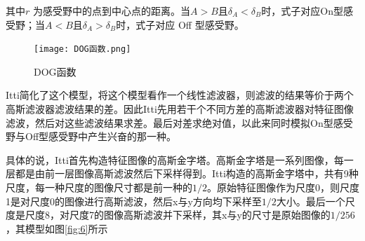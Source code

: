 \documentclass[a4paper,12pt]{article}
\begin{document}
其中$r$ 为感受野中的点到中心点的距离。当$A>B$且$\delta_{A}<\delta_{B}$时，式子对应On型感受野；当$A<B$且$\delta_{A}>\delta_{B}$时，式子对应 Off 型感受野。
\begin{figure}[!htb]
\centering
\texttt{[image: DOG函数.png]}
\caption{DOG函数}\label{fig:5} 
\end{figure}

Itti简化了这个模型，将这个模型看作一个线性滤波器，则滤波的结果等价于两个高斯滤波器滤波结果的差。因此Itti先用若干个不同方差的高斯滤波器对特征图像滤波，然后对这些滤波结果求差。最后对差求绝对值，以此来同时模拟On型感受野与Off型感受野中产生兴奋的那一种。


具体的说，Itti首先构造特征图像的高斯金字塔。高斯金字塔是一系列图像，每一层都是由前一层图像高斯滤波然后下采样得到。Itti构造的高斯金字塔中，共有9种尺度，每一种尺度的图像尺寸都是前一种的$1/2$。原始特征图像作为尺度0，则尺度1是对尺度0的图像进行高斯滤波，然后x与y方向均下采样至$1/2$大小。最后一个尺度是尺度8，对尺度7的图像高斯滤波并下采样，其x与y的尺寸是原始图像的$1/256$，其模型如图\ref{fig:6}所示

\end{document}

